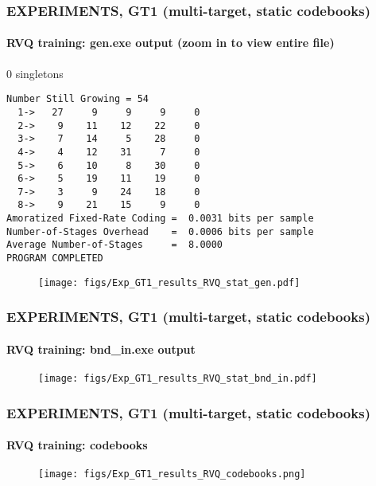 \begin{frame}[fragile]
\frametitle{\small EXPERIMENTS, GT1 (multi-target, static codebooks)}
\framesubtitle{RVQ training: gen.exe output {\tiny (zoom in to view entire file)}}
\mypagenum
	\vspace{0.1in}
	0 singletons
	\tiny
	\begin{verbatim}
Number Still Growing = 54
  1->   27     9     9     9     0 
  2->    9    11    12    22     0 
  3->    7    14     5    28     0 
  4->    4    12    31     7     0 
  5->    6    10     8    30     0 
  6->    5    19    11    19     0 
  7->    3     9    24    18     0 
  8->    9    21    15     9     0 
Amoratized Fixed-Rate Coding =  0.0031 bits per sample
Number-of-Stages Overhead    =  0.0006 bits per sample
Average Number-of-Stages     =  8.0000
PROGRAM COMPLETED
	\end{verbatim}
	\begin{figure}
		\texttt{[image: figs/Exp\_GT1\_results\_RVQ\_stat\_gen.pdf]}
	\end{figure}
\end{frame}



\begin{frame}
\frametitle{\small EXPERIMENTS, GT1 (multi-target, static codebooks)}
\framesubtitle{RVQ training: bnd\_in.exe output}
\mypagenum
	\begin{figure}
		\texttt{[image: figs/Exp\_GT1\_results\_RVQ\_stat\_bnd\_in.pdf]}
	\end{figure}
\end{frame}


\begin{frame}
\frametitle{\small EXPERIMENTS, GT1 (multi-target, static codebooks)}
\framesubtitle{RVQ training: codebooks}
\mypagenum
	\begin{figure}
		\texttt{[image: figs/Exp\_GT1\_results\_RVQ\_codebooks.png]}
	\end{figure}
\end{frame}






